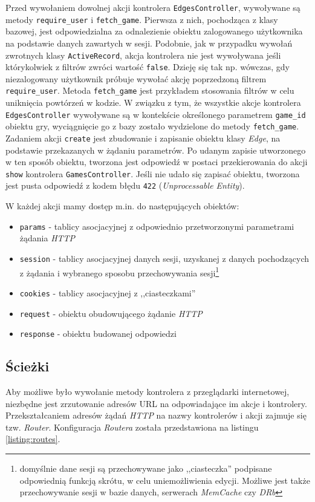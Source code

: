 \documentclass[11pt,twoside]{report}
\begin{document}
Przed wywołaniem dowolnej akcji kontrolera \texttt{EdgesController},
wywoływane są metody \texttt{require\_user} i
\texttt{fetch\_game}. Pierwsza z nich, pochodząca z klasy bazowej,
jest odpowiedzialna za odnalezienie obiektu zalogowanego użytkownika
na podstawie danych zawartych w sesji. Podobnie, jak w przypadku
wywołań zwrotnych klasy \texttt{ActiveRecord}, akcja kontrolera nie
jest wywoływana jeśli którykolwiek z filtrów zwróci wartość
\texttt{false}. Dzieję się tak np. wówczas, gdy niezalogowany
użytkownik próbuje wywołać akcję poprzedzoną filtrem
\texttt{require\_user}. Metoda \texttt{fetch\_game} jest przykładem
stosowania filtrów w celu uniknięcia powtórzeń w kodzie. W związku z
tym, że wszystkie akcje kontrolera \texttt{EdgesController} wywoływane
są w kontekście określonego parametrem \texttt{game\_id} obiektu gry,
wyciągnięcie go z bazy zostało wydzielone do metody
\texttt{fetch\_game}. Zadaniem akcji \texttt{create} jest zbudowanie i
zapisanie obiektu klasy \emph{Edge}, na podstawie przekazanych w
żądaniu parametrów. Po udanym zapisie utworzonego w ten sposób
obiektu, tworzona jest odpowiedź w postaci przekierowania do akcji
\texttt{show} kontrolera \texttt{GamesController}. Jeśli nie udało się
zapisać obiektu, tworzona jest pusta odpowiedź z kodem błędu
\texttt{422} (\emph{Unprocessable Entity}).

W każdej akcji mamy dostęp m.in. do następujących obiektów:

\begin{itemize}
\item \texttt{params} - tablicy asocjacyjnej z odpowiednio
  przetworzonymi parametrami żądania \emph{HTTP}
\item \texttt{session} - tablicy asocjacyjnej danych sesji, uzyskanej
  z danych pochodzących z żądania i wybranego sposobu przechowywania
  sesji\footnote{domyślnie dane sesji są przechowywane jako
    ,,ciasteczka'' podpisane odpowiednią funkcją skrótu, w celu
    uniemożliwienia edycji. Możliwe jest także przechowywanie sesji w
    bazie danych, serwerach \emph{MemCache} czy \emph{DRb}}
\item \texttt{cookies} - tablicy asocjacyjnej z ,,ciasteczkami''
\item \texttt{request} - obiektu obudowującego żądanie \emph{HTTP}
\item \texttt{response} - obiektu budowanej odpowiedzi
\end{itemize}

\subsection{Ścieżki}\label{sec:routes}
Aby możliwe było wywołanie metody kontrolera z przeglądarki
internetowej, niezbędne jest zrzutowanie adresów URL na odpowiadające
im akcje i kontrolery. Przekształcaniem adresów żądań \emph{HTTP} na
nazwy kontrolerów i akcji zajmuje się tzw. \emph{Router}. Konfiguracja
\emph{Routera} została przedstawiona na listingu \ref{listing:routes}.
\end{document}
